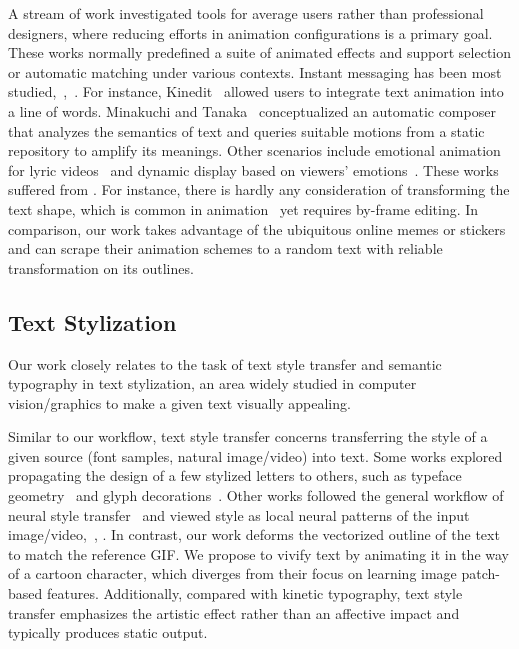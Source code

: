 A stream of work investigated tools for average users rather than professional designers, where reducing efforts in animation configurations is a primary goal.
These works normally predefined a suite of animated effects and support selection or automatic matching under various contexts.
Instant messaging has been most studied,~\eg,~\cite{gaylord2015atim,yeo2008kim,forlizzi2003kinedit, minakuchi2005kinetic}.
For instance, Kinedit~\cite{forlizzi2003kinedit} allowed users to integrate text animation into a line of words.
Minakuchi and Tanaka~\cite{minakuchi2005kinetic} conceptualized an automatic composer that analyzes the semantics of text and queries suitable motions from a static repository to amplify its meanings.
Other scenarios include emotional animation for lyric videos~\cite{vy2008enact} and dynamic display based on viewers' emotions~\cite{lim2022study}.
These works suffered from .
For instance, there is hardly any consideration of transforming the text shape, which is common in animation~\cite{thomas1995illusion} yet requires by-frame editing.
In comparison, our work takes advantage of the ubiquitous online memes or stickers and can scrape their animation schemes to a random text with reliable transformation on its outlines.


\subsection{Text Stylization}
Our work closely relates to the task of text style transfer and semantic typography in text stylization, an area widely studied in computer vision/graphics to make a given text visually appealing.

Similar to our workflow, text style transfer concerns transferring the style of a given source (font samples, natural image/video) into text.
Some works explored propagating the design of a few stylized letters to others, such as typeface geometry~\cite{phan2015flexyfont} and glyph decorations~\cite{wang2019typography}.
Other works followed the general workflow of neural style transfer~\cite{gatys2016image} and viewed style as local neural patterns of the input image/video,~\eg, \cite{mao2022intelligent, yang2021shape, men2019dyntypo}.
In contrast, our work deforms the vectorized outline of the text to match the reference GIF.
We propose to vivify text by animating it in the way of a cartoon character, which diverges from their focus on learning image patch-based features.
Additionally, compared with kinetic typography, text style transfer emphasizes the artistic effect rather than an affective impact and typically produces static output.

